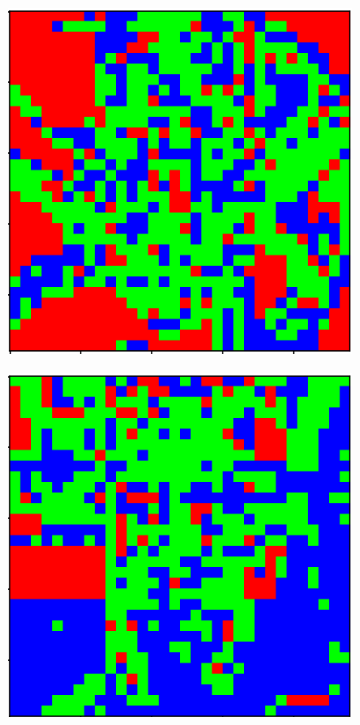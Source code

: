 \documentclass{aci}
\numberwithin{equation}{section}
\begin{document}
\begin{figure}
    \begin{subfigure}{\segmentedsubwidth}
        \includegraphics[width=1\linewidth]{figs/15/r103.png}
    \end{subfigure}
    \begin{subfigure}{\segmentedsubwidth}
        \includegraphics[width=1\linewidth]{figs/15/r111.png}

\end{subfigure}
\end{figure}
\end{document}
